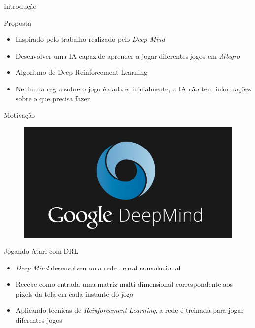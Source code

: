 \documentclass[aspectratio=169]{beamer}
\begin{document}

\begin{frame}{Introdução}

\begin{block}{\large{{Proposta}}}
	\begin{itemize}
		\item Inspirado pelo trabalho realizado pelo \textit{Deep Mind} \cite{play-atari-drl-deepmind}
		\item Desenvolver uma IA capaz de aprender a jogar diferentes jogos em \textit{Allegro}
		\item Algoritmo de Deep Reinforcement Learning
		\item Nenhuma regra sobre o jogo é dada e, inicialmente, a IA não tem informações sobre o que precisa fazer
	\end{itemize}
\end{block}
\end{frame}

\begin{frame}{Motivação}
\begin{figure}
\centering
\includegraphics[width=.4 \textwidth]{imgs/google-deepmind.jpg}
\end{figure}

\begin{block}{\large{{Jogando Atari com DRL}}}
	\begin{itemize}
		\item \textit{Deep Mind} desenvolveu uma rede neural convolucional
		\item Recebe como entrada uma matriz multi-dimensional correspondente aos pixels da tela em cada instante do jogo
		\item Aplicando técnicas de \textit{Reinforcement Learning}, a rede é treinada para jogar diferentes jogos
	\end{itemize}
\end{block}

\end{frame}
\end{document}

